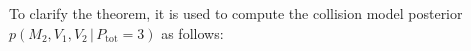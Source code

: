 \documentclass[letterpaper]{article}
\newcommand{\pr}{p}
\newcommand{\dd}{\;\mathrm{d}} %
\begin{document}

To clarify the theorem, it is used to compute the collision model posterior $\pr(M_2, V_1, V_2 \,|\, P_\text{tot} = 3)$ as follows:
\end{document}
